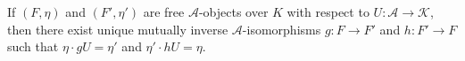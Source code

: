 If $(F, \eta)$ and $(F', \eta')$ are free $\mathcal{A}$-objects over $K$ with respect to $U: \mathcal{A} \longrightarrow \mathcal{K}$, then there exist unique mutually inverse $\mathcal{A}$-isomorphisms $g: F \longrightarrow F'$ and $h: F' \longrightarrow F$ such that $\eta \cdot gU = \eta'$ and $\eta' \cdot hU = \eta$.
